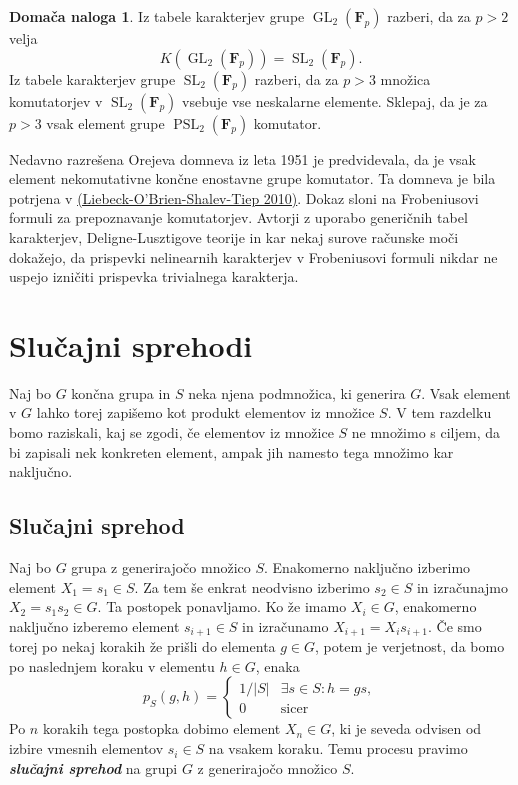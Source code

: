 \documentclass[11pt]{book}
\def\FF{\mathbf{F}}
\DeclareMathOperator\GL{GL}
\DeclareMathOperator\SL{SL}
\DeclareMathOperator\PSL{PSL}
\def\definicija{\color{rdeca}\bf\em}
\theoremstyle{definition}
\theoremstyle{zgled}
\theoremstyle{odprtproblem}
\theoremstyle{domacanaloga}
\newtheorem*{domacanaloga}{Domača naloga}
\theoremstyle{izrek}
\begin{document}
\begin{domacanaloga}
Iz tabele karakterjev grupe $\GL_2(\FF_p)$ razberi, da za $p>2$ velja
\[
    \textstyle K(\GL_2(\FF_p)) = \SL_2(\FF_p).
\]
Iz tabele karakterjev grupe $\SL_2(\FF_p)$ razberi, da za $p>3$ množica komutatorjev v $\SL_2(\FF_p)$ vsebuje vse neskalarne elemente. Sklepaj, da je za $p>3$ vsak element grupe $\PSL_2(\FF_p)$ komutator.
\end{domacanaloga}

Nedavno razrešena Orejeva domneva iz leta 1951 je predvidevala, da je vsak element nekomutativne končne enostavne grupe komutator. Ta domneva je bila potrjena v \href{https://ems.press/journals/jems/articles/3979}{(Liebeck-O'Brien-Shalev-Tiep 2010)}. Dokaz sloni na Frobeniusovi formuli za prepoznavanje komutatorjev. Avtorji z uporabo generičnih tabel karakterjev, Deligne-Lusztigove teorije in kar nekaj surove računske moči dokažejo, da prispevki nelinearnih karakterjev v Frobeniusovi formuli nikdar ne uspejo izničiti prispevka trivialnega karakterja.


\section{Slučajni sprehodi}

Naj bo $G$ končna grupa in $S$ neka njena podmnožica, ki generira $G$. Vsak element v $G$ lahko torej zapišemo kot produkt elementov iz množice $S$. V tem razdelku bomo raziskali, kaj se zgodi, če elementov iz množice $S$ ne množimo s ciljem, da bi zapisali nek konkreten element, ampak jih namesto tega množimo kar naključno. 

\subsection{Slučajni sprehod}

Naj bo $G$ grupa z generirajočo množico $S$. Enakomerno naključno izberimo element $X_1 = s_1 \in S$. Za tem še enkrat neodvisno izberimo $s_2 \in S$ in izračunajmo $X_2 = s_1 s_2 \in G$. Ta postopek ponavljamo. Ko že imamo $X_i \in G$, enakomerno naključno izberemo element $s_{i+1} \in S$ in izračunamo $X_{i+1} = X_i s_{i+1}$. Če smo torej po nekaj korakih že prišli do elementa $g \in G$, potem je verjetnost, da bomo po naslednjem koraku v elementu $h \in G$, enaka 
\[
p_S(g, h)
    = \begin{cases}
        1/|S| & \exists s \in S \colon h = g s, \\
        0 & \text{sicer}
    \end{cases}
\]
Po $n$ korakih tega postopka dobimo element $X_n \in G$, ki je seveda odvisen od izbire vmesnih elementov $s_i \in S$ na vsakem koraku. Temu procesu pravimo {\definicija slučajni sprehod} na grupi $G$ z generirajočo množico $S$. 
\end{document}
